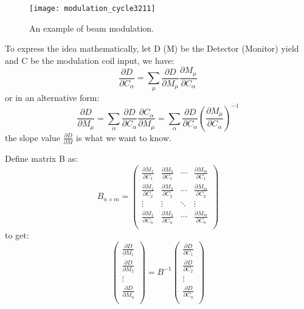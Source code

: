 \begin{figure}
    \centering
    \texttt{[image: modulation\_cycle3211]}
    \caption{An example of beam modulation.}
\end{figure}

To express the idea mathematically, let D (M) be the Detector (Monitor) yield and C be
the modulation coil input, we have:
\begin{equation}
    \frac{\partial D}{\partial C_\alpha} = \sum_\mu \frac{\partial D}{\partial M_\mu}\frac{\partial M_\mu}{\partial C_\alpha}
\end{equation}
or in an alternative form:
\begin{equation}
    \frac{\partial D}{\partial M_\mu} = \sum_\alpha \frac{\partial D}{\partial C_\alpha}\frac{\partial C_\alpha}{\partial M_\mu} = \sum_\alpha \frac{\partial D}{\partial C_\alpha}\left(\frac{\partial M_\mu}{\partial C_\alpha}\right)^{-1}
\end{equation}
the slope value $\frac{\partial D}{\partial M}$ is what we want to know.

Define matrix B as:
\begin{equation}
    B_{n \times m} = 
    \begin{pmatrix}
	\frac{\partial M_1}{\partial C_1}   & \frac{\partial M_2}{\partial C_1}	& \cdots  & \frac{\partial M_m}{\partial C_1}   \\
	\frac{\partial M_1}{\partial C_2}   & \frac{\partial M_2}{\partial C_2}	& \cdots  & \frac{\partial M_m}{\partial C_2}   \\
	\vdots	& \vdots    & \ddots	& \vdots    \\
	\frac{\partial M_1}{\partial C_n}   & \frac{\partial M_2}{\partial C_n}	& \cdots  & \frac{\partial M_m}{\partial C_n}   \\
    \end{pmatrix}
\end{equation}
to get:
\begin{equation}
    \begin{pmatrix}
	\frac{\partial D}{\partial M_1}	\\
	\frac{\partial D}{\partial M_2}	\\
	\vdots	\\
	\frac{\partial D}{\partial M_n}	\\
    \end{pmatrix}
    =
    B^{-1}
    \begin{pmatrix}
	\frac{\partial D}{\partial C_1}	\\
	\frac{\partial D}{\partial C_2}	\\
	\vdots	\\
	\frac{\partial D}{\partial C_n}	\\
    \end{pmatrix}
\end{equation}

